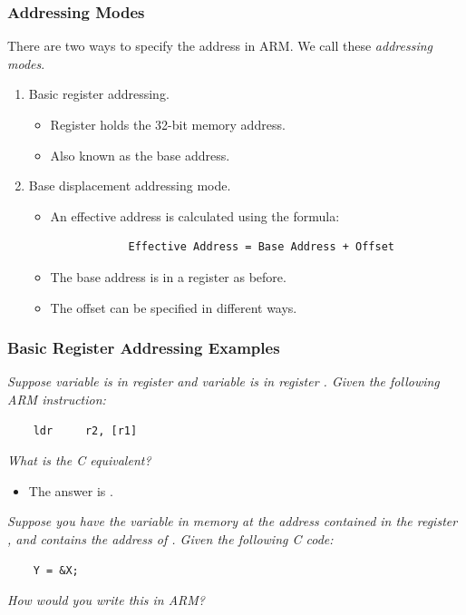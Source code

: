\documentclass[letterpaper]{article}
\begin{document}
\subsubsection{Addressing Modes}
There are two ways to specify the address in ARM. We call these \emph{addressing modes}.
\begin{enumerate}
    \item Basic register addressing. 
    \begin{itemize}
        \item Register holds the 32-bit memory address. 
        \item Also known as the base address. 
    \end{itemize}

    \item Base displacement addressing mode. 
    \begin{itemize}
        \item An effective address is calculated using the formula:
        \begin{verbatim}
            Effective Address = Base Address + Offset
        \end{verbatim}
        \item The base address is in a register as before. 
        \item The offset can be specified in different ways. 
    \end{itemize}
\end{enumerate}

\subsubsection{Basic Register Addressing Examples}
\emph{Suppose variable  is in register  and variable  is in register . Given the following ARM instruction:}
\begin{verbatim}
    ldr     r2, [r1]
\end{verbatim}
\emph{What is the C equivalent?}

\begin{itemize}
    \item The answer is .
\end{itemize}

\bigskip 
\bigskip 

\emph{Suppose you have the variable  in memory at the address contained in the register , and  contains the address of . Given the following C code:}
\begin{verbatim}
    Y = &X;
\end{verbatim}
\emph{How would you write this in ARM?}
\end{document}
